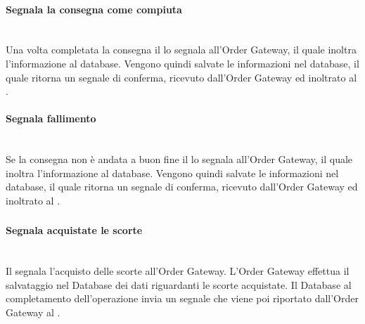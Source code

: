 \paragraph{Segnala la consegna come compiuta}\mbox{}\\
Una volta completata la consegna il \Deliveryman{} lo segnala all'Order Gateway, il quale inoltra l'informazione al database. Vengono quindi salvate le informazioni nel database, il quale ritorna un segnale di conferma, ricevuto dall'Order Gateway ed inoltrato al \Deliveryman{}.

\paragraph{Segnala fallimento}\mbox{}\\
Se la consegna non è andata a buon fine il \Deliveryman{} lo segnala all'Order Gateway, il quale inoltra l'informazione al database. Vengono quindi salvate le informazioni nel database, il quale ritorna un segnale di conferma, ricevuto dall'Order Gateway ed inoltrato al \Deliveryman{}.

\subsubsection{\Purchasingmanager{}}

\paragraph{Segnala acquistate le scorte}\mbox{}\\
Il \Purchasingmanager{} segnala l'acquisto delle scorte all'Order Gateway. L'Order Gateway effettua il salvataggio nel Database dei dati riguardanti le scorte acquistate. Il Database al completamento dell'operazione invia un segnale che viene poi riportato dall'Order Gateway al \Purchasingmanager{}.

